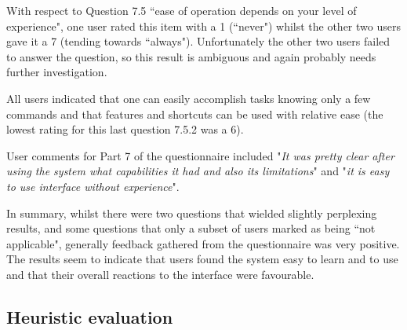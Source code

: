 With respect to Question 7.5 ``ease of operation depends on your level of experience", one user rated this item with a 1 (``never") whilst the other two users gave it a 7 (tending towards ``always"). Unfortunately the other two users failed to answer the question, so this result is ambiguous and again probably needs further investigation. 

All users indicated that one can easily accomplish tasks knowing only a few commands and that features and shortcuts can be used with relative ease (the lowest rating for this last question 7.5.2 was a 6).

User comments for Part 7 of the questionnaire included "\textit{It was pretty clear after using the system what capabilities it had and also its limitations}" and "\textit{it is easy to use interface without experience}".

In summary, whilst there were two questions that wielded slightly perplexing results, and some questions that only a subset of users marked as being ``not applicable", generally feedback gathered from the questionnaire was very positive. The results seem to indicate that users found the system easy to learn and to use and that their overall reactions to the interface were favourable. 

\subsection{Heuristic evaluation}


